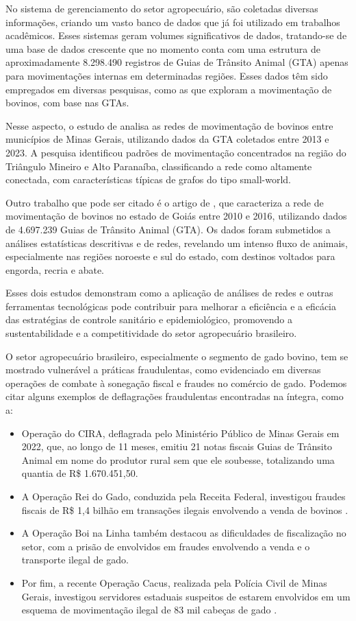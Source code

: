 No sistema de gerenciamento do setor agropecuário, são coletadas diversas informações, criando um vasto banco de dados que já foi utilizado em trabalhos acadêmicos. Esses sistemas geram volumes significativos de dados, tratando-se de uma base de dados crescente que no momento conta com uma estrutura de aproximadamente 8.298.490 registros de Guias de Trânsito Animal (GTA) apenas para movimentações internas em determinadas regiões. Esses dados têm sido empregados em diversas pesquisas, como as que exploram a movimentação de bovinos, com base nas GTAs.

Nesse aspecto, o estudo de  analisa as redes de movimentação de bovinos entre municípios de Minas Gerais, utilizando dados da GTA coletados entre 2013 e 2023. A pesquisa identificou padrões de movimentação concentrados na região do Triângulo Mineiro e Alto Paranaíba, classificando a rede como altamente conectada, com características típicas de grafos do tipo small-world. 

Outro trabalho que pode ser citado é o artigo de , que caracteriza a rede de movimentação de bovinos no estado de Goiás entre 2010 e 2016, utilizando dados de 4.697.239 Guias de Trânsito Animal (GTA). Os dados foram submetidos a análises estatísticas descritivas e de redes, revelando um intenso fluxo de animais, especialmente nas regiões noroeste e sul do estado, com destinos voltados para engorda, recria e abate. 

Esses dois estudos demonstram como a aplicação de análises de redes e outras ferramentas tecnológicas pode contribuir para melhorar a eficiência e a eficácia das estratégias de controle sanitário e epidemiológico, promovendo a sustentabilidade e a competitividade do setor agropecuário brasileiro.

O setor agropecuário brasileiro, especialmente o segmento de gado bovino, tem se mostrado vulnerável a práticas fraudulentas, como evidenciado em diversas operações de combate à sonegação fiscal e fraudes no comércio de gado. Podemos citar alguns exemplos de deflagrações fraudulentas encontradas na íntegra, como a:

\begin{itemize}
\item Operação do CIRA, deflagrada pelo Ministério Público de Minas Gerais em 2022, que, ao longo de 11 meses, emitiu 21 notas fiscais Guias de Trânsito Animal em nome do produtor rural sem que ele soubesse, totalizando uma quantia de R\$ 1.670.451,50. 
\item A Operação Rei do Gado, conduzida pela Receita Federal, investigou fraudes fiscais de R\$ 1,4 bilhão em transações ilegais envolvendo a venda de bovinos \cite{cnn2023}. 
\item A Operação Boi na Linha \cite{g12016} também destacou as dificuldades de fiscalização no setor, com a prisão de envolvidos em fraudes envolvendo a venda e o transporte ilegal de gado. 
\item Por fim, a recente Operação Cacus, realizada pela Polícia Civil de Minas Gerais, investigou servidores estaduais suspeitos de estarem envolvidos em um esquema de movimentação ilegal de 83 mil cabeças de gado \cite{g12024}.
\end{itemize}

